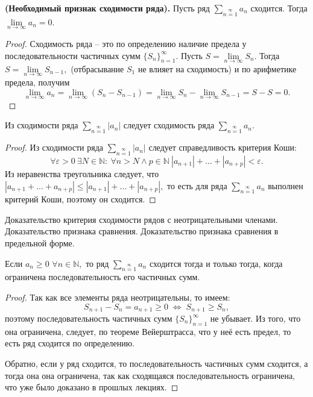 \begin{proposition}\textbf{(Необходимый признак сходимости ряда).}
    Пусть ряд $\sum\limits_{n=1}\limits^{\infty}a_n$
    сходится. Тогда $\lim\limits_{n\rightarrow\infty}
        a_n=0.$
\end{proposition}
\begin{proof}
    Сходимость ряда -- это по определению
    наличие предела у последовательности
    частичных сумм $\{S_n\}_{n=1}^{\infty}.$
    Пусть $S=\lim\limits_{n\rightarrow\infty}S_n.$
    Тогда $S=\lim\limits_{n\rightarrow\infty}S_{n-1},$
    (отбрасывание $S_1$ не влияет на сходимость)
    и по арифметике предела, получим
    $$\lim\limits_{n\rightarrow\infty}
        a_n=\lim\limits_{n\rightarrow\infty}(S_{n}-S_{n-1})=
        \lim\limits_{n\rightarrow\infty}S_{n}-
        \lim\limits_{n\rightarrow\infty}S_{n-1}=S-S=0.$$
\end{proof}

\begin{proposition}
    Из сходимости ряда
    $\sum\limits_{n=1}\limits^{\infty}|a_n|$
    следует сходимость ряда
    $\sum\limits_{n=1}\limits^{\infty}a_n.$
\end{proposition}
\begin{proof}
    Из сходимости ряда
    $\sum\limits_{n=1}\limits^{\infty}|a_n|$
    следует справедливость критерия Коши:
    $$\forall\varepsilon>0 \ \exists N\in
        \mathbb{N}: \ \forall n>N\wedge
        p\in\mathbb{N} \ |a_{n+1}|+...+|a_{n+p}|<\varepsilon.$$
    Из неравенства треугольника следует,
    что $|a_{n+1}+...+a_{n+p}|\leq|a_{n+1}|+...+|a_{n+p}|,$
    то есть для ряда $\sum\limits_{n=1}\limits^{\infty}a_n$
    выполнен критерий Коши, поэтому он сходится.
\end{proof}

\newpage
\begin{problem}
Доказательство критерия сходимости рядов с неотрицательными членами. Доказательство признака сравнения. Доказательство признака сравнения в предельной форме.
\end{problem}

\begin{proposition}
    Если $a_n\geq0$ $\forall n\in\mathbb{N},$
    то ряд $\sum\limits_{n=1}\limits^{\infty}a_n$
    сходится тогда и только тогда,
    когда ограничена последовательность его
    частичных сумм.
\end{proposition}
\begin{proof}
    Так как все элементы ряда неотрицательны, то
    имеем:
    $$S_{n+1}-S_n=a_{n+1}\geq0\;\Leftrightarrow\;
        S_{n+1}\geq S_n,$$ поэтому последовательность
    частичных сумм $\{S_n\}_{n=1}^{\infty}$
    не убывает. Из того, что она ограничена,
    следует, по теореме Вейерштрасса, что у неё
    есть предел, то есть ряд сходится по
    определению.

    Обратно, если у ряд сходится, то
    последовательность
    частичных сумм сходится, а тогда она
    она ограничена, так как сходящаяся
    последовательность ограничена,
    что уже было доказано в прошлых
    лекциях.
\end{proof}

